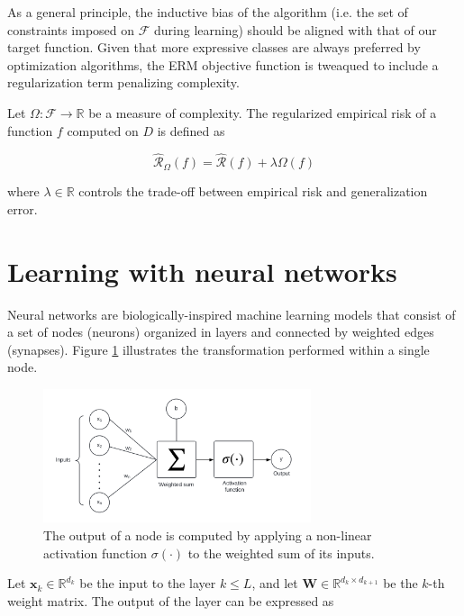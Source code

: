 As a general principle, the inductive bias of the algorithm (i.e. the set of constraints imposed on $\mathcal{F}$ during learning) should be aligned with
that of our target function. Given that more expressive classes are always preferred by optimization algorithms, the ERM
objective function is tweaqued to include a regularization term penalizing complexity.

\begin{definition} Let $\Omega: \mathcal{F} \to \mathbb{R}$ be a measure of complexity. The regularized empirical risk of a function $f$
    computed on $D$ is defined as

    $$
    \hat{\mathcal{R}}_{\Omega}(f)=\hat{\mathcal{R}}(f) + \lambda \Omega(f)
    $$

    where $\lambda \in \mathbb{R}$ controls the trade-off between empirical risk and generalization error.

\end{definition}



\section{Learning with neural networks}

Neural networks are biologically-inspired machine learning models that consist of a set of 
nodes (neurons) organized in layers and connected by weighted edges
(synapses). Figure \ref{fig:nn_node} illustrates the transformation
performed within a single node. 

\begin{figure}[H]
    \centering
    \includegraphics[width=0.7\textwidth]{img/theoretical_background/nn_node.png}
    \caption{The output of a node is computed by applying a non-linear
    activation function $\sigma(\cdot)$ to the weighted sum of its inputs.}
    \label{fig:nn_node}
\end{figure}

Let $\bm{x}_k \in \mathbb{R}^{d_k}$ be the input to the layer $k \leq L$, and let $\bm{W} \in \mathbb{R}^{d_k \times d_{k+1}}$ be the $k$-th weight matrix. The output of the layer can be expressed as

